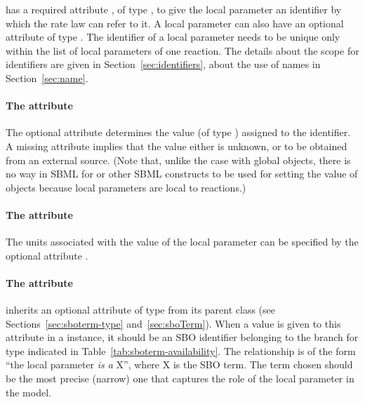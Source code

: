 \LocalParameter has a required attribute , of type
, to give the local parameter an identifier by which
the rate law can refer to it.  A local
parameter can also have an optional  attribute of type
.  The identifier of a local parameter needs to be 
unique only within the list of local parameters of one reaction. The details 
about the scope for identifiers are given in Section~\ref{sec:identifiers}, about
the use of names in Section~\ref{sec:name}.


\paragraph{The  attribute}

The optional attribute  determines the value (of type
) assigned to the identifier.  A missing
 attribute implies that the value either is unknown,
or to be obtained from an external source.  (Note that, unlike the
case with global \Parameter objects, there is no way in SBML
\thisLV for \InitialAssignment or other SBML constructs to be used
for setting the value of \LocalParameter objects because local
parameters are local to reactions.)


\paragraph{The  attribute}

The units associated with the value of the local parameter can be specified
by the optional attribute . 


\paragraph{The  attribute}

\LocalParameter inherits an optional 
attribute of type  from its parent
class \SBase (see Sections~\ref{sec:sboterm-type}
and~\ref{sec:sboTerm}).  When a value is given to this
attribute in a  \LocalParameter instance, it should be an
SBO identifier belonging to the branch for type  \LocalParameter
indicated in Table~\ref{tab:sboterm-availability}.  The relationship is
of the form ``the local parameter \emph{is a} X'', where X is
the SBO term.  The term chosen should be the most precise (narrow)
one that captures the role of the local parameter in the model.


